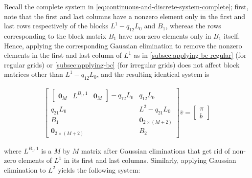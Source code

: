 \documentclass[11pt]{article}
\theoremstyle{definition}
\begin{document}
Recall the complete system in \eqref{eq:continuous-and-discrete-system-complete}; first, note that the first and last columns have a nonzero element only in the first and last rows respectively of the blocks $L^1 - q_{12} L_0$ and $B_1$, whereas the rows corresponding to the block matrix $B_1$ have non-zero elements only in $B_1$ itself. Hence, applying the corresponding Gaussian elimination to remove the nonzero elements in the first and last column of $L^1$ as in \eqref{subsec:applying-bc-regular} (for regular grids) or \eqref{subsec:applying-bc} (for irregular grids) does not affect block matrices other than $L^1 - q_{12} L_0$, and the resulting identical system is

\begin{align}
\begin{bmatrix}
\begin{bmatrix}
\mathbf{0}_M & {L}^{B_1,1} & \mathbf{0}_M
\end{bmatrix} 
- q_{12} L_0 & q_{12} L_0 \\ 
 q_{21}  L_0 & {L}^2 - q_{21} L_0 \\
B_1 & \mathbf{0}_{2 \times (M+2)} \\
\mathbf{0}_{2 \times (M+2)} & B_2 
\end{bmatrix}
\overline{v}
=
\begin{bmatrix}
\pi \\ 
b
\end{bmatrix}
\end{align}

where $L^{B_1,1}$ is a $M$ by $M$ matrix after Gaussian eliminations that get rid of non-zero elements of $L^{1}$ in its first and last columns. Similarly, applying Gaussian elimination to $L^2$ yields the following system:
\end{document}
